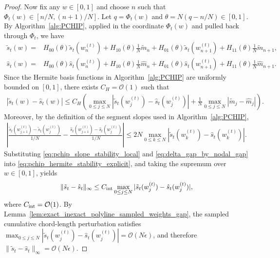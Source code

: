 \documentclass{article}
\newcommand{\Oc}{\mathcal{O}}
\newcommand{\Farc}{\Phi}
\begin{document}
\begin{proof}
Now fix any $w\in[0,1]$ and choose $n$ such that $\Farc_t(w)\in[n/N,(n+1)/N]$. Let $q=\Farc_t(w)$ and $\theta=N(q-n/N)\in[0,1]$. By Algorithm~\ref{alg:PCHIP}, applied in the coordinate $\Farc_t(w)$ and pulled back through $\Farc_t$, we have
\begin{align}
\tilde s_t(w) = & H_{00}(\theta)\tilde s_t(w_n^{(t)}) + H_{10}(\theta)\frac{1}{N}\tilde m_n + H_{01}(\theta)\tilde s_t(w_{n+1}^{(t)}) + H_{11}(\theta)\frac{1}{N}\tilde m_{n+1},\\
\hat s_t(w) = & H_{00}(\theta)\hat s_t(w_n^{(t)}) + H_{10}(\theta)\frac{1}{N}\hat m_n + H_{01}(\theta)\hat s_t(w_{n+1}^{(t)}) + H_{11}(\theta)\frac{1}{N}\hat m_{n+1}.
\end{align}
Since the Hermite basis functions in Algorithm~\ref{alg:PCHIP} are uniformly bounded on $[0,1]$, there exists $C_H=\Oc(1)$ such that
\begin{align}
|\tilde s_t(w)-\hat s_t(w)| \le C_H\left(\max_{0\le j\le N}|\tilde s_t(w_j^{(t)})-\hat s_t(w_j^{(t)})|+\frac1N\max_{0\le j\le N}|\tilde m_j-\hat m_j|\right).
\label{eq:pchip_hermite_stability_explicit}
\end{align}
Moreover, by the definition of the segment slopes used in Algorithm~\ref{alg:PCHIP},
\begin{align}
\left|\frac{\tilde s_t(w_{j+1}^{(t)})-\tilde s_t(w_j^{(t)})}{1/N}-\frac{\hat s_t(w_{j+1}^{(t)})-\hat s_t(w_j^{(t)})}{1/N}\right| \le 2N\max_{0\le k\le N}|\tilde s_t(w_k^{(t)})-\hat s_t(w_k^{(t)})|.
\label{eq:delta_gap_by_nodal_gap}
\end{align}
Substituting \eqref{eq:pchip_slope_stability_local} and \eqref{eq:delta_gap_by_nodal_gap} into \eqref{eq:pchip_hermite_stability_explicit}, and taking the supremum over $w\in[0,1]$, yields
\begin{align}
\|\tilde s_t-\hat s_t\|_\infty \le C_{\rm int}\max_{0\le j\le N}|\tilde s_t(w_j^{(t)})-\hat s_t(w_j^{(t)})|,
\label{eq:pchip_local_stability_exact_inexact_final}
\end{align}
where $C_{\rm int}=\Oc(1)$. By Lemma~\ref{lem:exact_inexact_polyline_sampled_weights_gap}, the sampled cumulative chord-length perturbation satisfies $\max_{0\le j\le N}|\tilde s_t(w_j^{(t)})-\hat s_t(w_j^{(t)})| = \Oc(N\epsilon)$, and therefore $\|\tilde s_t-\hat s_t\|_\infty = \Oc(N\epsilon)$.


\end{proof}
\end{document}
